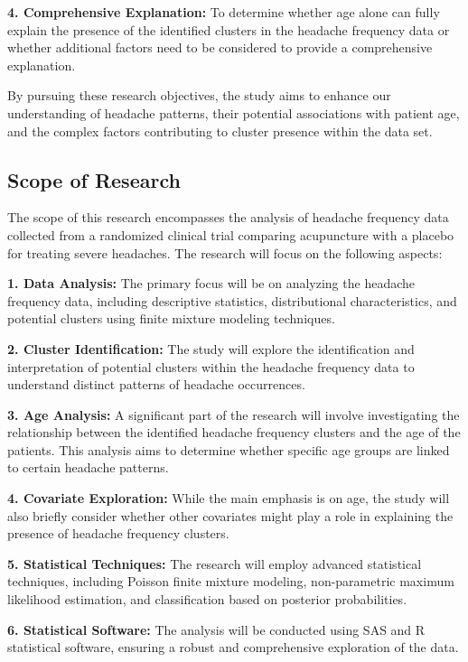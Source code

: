 \documentclass[a4paper, 12pt]{article}
\begin{document}
\textbf{4. Comprehensive Explanation:} To determine whether age alone can fully explain the presence of the identified clusters in the headache frequency data or whether additional factors need to be considered to provide a comprehensive explanation.

By pursuing these research objectives, the study aims to enhance our understanding of headache patterns, their potential associations with patient age, and the complex factors contributing to cluster presence within the data set.

    \subsection{Scope of Research}
The scope of this research encompasses the analysis of headache frequency data collected from a randomized clinical trial comparing acupuncture with a placebo for treating severe headaches. The research will focus on the following aspects:

\textbf{1. Data Analysis:} The primary focus will be on analyzing the headache frequency data, including descriptive statistics, distributional characteristics, and potential clusters using finite mixture modeling techniques.

\textbf{2. Cluster Identification:} The study will explore the identification and interpretation of potential clusters within the headache frequency data to understand distinct patterns of headache occurrences.

\textbf{3. Age Analysis:} A significant part of the research will involve investigating the relationship between the identified headache frequency clusters and the age of the patients. This analysis aims to determine whether specific age groups are linked to certain headache patterns.

\textbf{4. Covariate Exploration:} While the main emphasis is on age, the study will also briefly consider whether other covariates might play a role in explaining the presence of headache frequency clusters.

\textbf{5. Statistical Techniques:} The research will employ advanced statistical techniques, including Poisson finite mixture modeling, non-parametric maximum likelihood estimation, and classification based on posterior probabilities.

\textbf{6. Statistical Software:} The analysis will be conducted using SAS and R statistical software, ensuring a robust and comprehensive exploration of the data.
\end{document}
